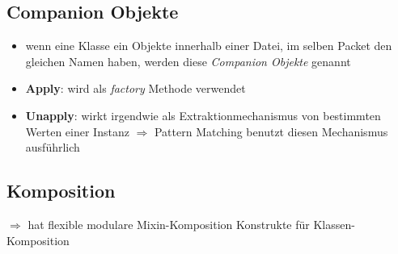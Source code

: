 \subsection{Companion Objekte}
\begin{itemize}
  \item wenn eine Klasse \und ein Objekte innerhalb einer Datei, im selben
  Packet den gleichen Namen haben, werden diese \textit{Companion Objekte}
  genannt
  \item \textbf{Apply}: wird als \textit{factory} Methode verwendet
  
  
  
  \item \textbf{Unapply}: wirkt irgendwie als Extraktionmechanismus von
  bestimmten Werten einer Instanz $\Rightarrow$ Pattern Matching
  benutzt diesen Mechanismus ausführlich
  
  
\end{itemize}


\subsection{Komposition}
$\Rightarrow$ hat flexible modulare Mixin-Komposition Konstrukte für 
Klassen-Komposition



